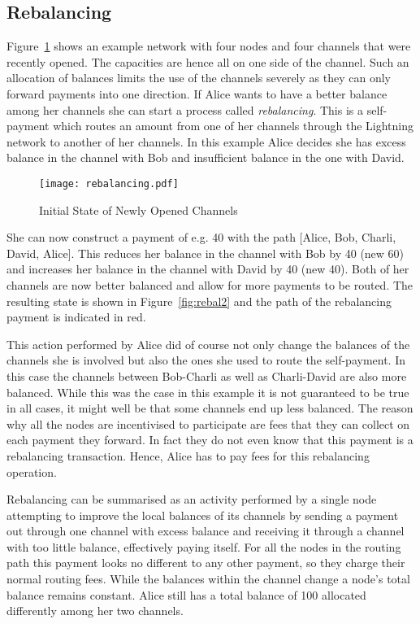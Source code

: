 \documentclass[final]{fhnwreport}       %
\begin{document}
\subsection{Rebalancing}\label{subsec:rebalancing}
Figure~\ref{fig:rebal} shows an example network with four nodes and four channels that were recently opened. The capacities are hence all on one side of the channel. Such an allocation of balances limits the use of the channels severely as they can only forward payments into one direction. If Alice wants to have a better balance among her channels she can start a process called \emph{rebalancing}. This is a self-payment which routes an amount from one of her channels through the Lightning network to another of her channels. In this example Alice decides she has excess balance in the channel with Bob and insufficient balance in the one with David.

\begin{figure}[H]
\centering
\texttt{[image: rebalancing.pdf]}
\caption{Initial State of Newly Opened Channels}
\label{fig:rebal}
\end{figure}

She can now construct a payment of e.g. 40 with the path [Alice, Bob, Charli, David, Alice]. This reduces her balance in the channel with Bob by 40 (new 60) and increases her balance in the channel with David by 40 (new 40). Both of her channels are now better balanced and allow for more payments to be routed. The resulting state is shown in Figure~\ref{fig:rebal2} and the path of the rebalancing payment is indicated in red. 

This action performed by Alice did of course not only change the balances of the channels she is involved but also the ones she used to route the self-payment. In this case the channels between Bob-Charli as well as Charli-David are also more balanced. While this was the case in this example it is not guaranteed to be true in all cases, it might well be that some channels end up less balanced. The reason why all the nodes are incentivised to participate are fees that they can collect on each payment they forward. In fact they do not even know that this payment is a rebalancing transaction. Hence, Alice has to pay fees for this rebalancing operation. 


Rebalancing can be summarised as an activity performed by a single node attempting to improve the local balances of its channels by sending a payment out through one channel with excess balance and receiving it through a channel with too little balance, effectively paying itself. For all the nodes in the routing path this payment looks no different to any other payment, so they charge their normal routing fees. While the balances within the channel change a node's total balance remains constant. Alice still has a total balance of 100 allocated differently among her two channels. 
\end{document}
